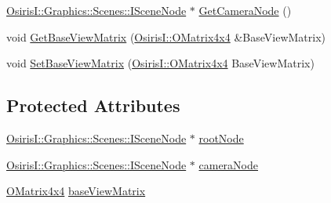 \begin{DoxyCompactItemize}
\item 
\hyperlink{class_osiris_i_1_1_graphics_1_1_scenes_1_1_i_scene_node}{Osiris\-I\-::\-Graphics\-::\-Scenes\-::\-I\-Scene\-Node} $\ast$ \hyperlink{class_osiris_i_1_1_graphics_1_1_renderer_1_1_i_renderer_aa52a5485fb2b04fc420fd615477ac683}{Get\-Camera\-Node} ()
\item 
void \hyperlink{class_osiris_i_1_1_graphics_1_1_renderer_1_1_i_renderer_adc629290666c90dc546a139cef4e8f3b}{Get\-Base\-View\-Matrix} (\hyperlink{struct_osiris_i_1_1_o_matrix4x4}{Osiris\-I\-::\-O\-Matrix4x4} \&Base\-View\-Matrix)
\item 
void \hyperlink{class_osiris_i_1_1_graphics_1_1_renderer_1_1_i_renderer_a3cc53b896fdc724d4f9519f5814fa179}{Set\-Base\-View\-Matrix} (\hyperlink{struct_osiris_i_1_1_o_matrix4x4}{Osiris\-I\-::\-O\-Matrix4x4} Base\-View\-Matrix)
\end{DoxyCompactItemize}
\subsection*{Protected Attributes}
\begin{DoxyCompactItemize}
\item 
\hyperlink{class_osiris_i_1_1_graphics_1_1_scenes_1_1_i_scene_node}{Osiris\-I\-::\-Graphics\-::\-Scenes\-::\-I\-Scene\-Node} $\ast$ \hyperlink{class_osiris_i_1_1_graphics_1_1_renderer_1_1_i_renderer_a402abcc0f06b70e7eea0706ac905c846}{root\-Node}
\item 
\hyperlink{class_osiris_i_1_1_graphics_1_1_scenes_1_1_i_scene_node}{Osiris\-I\-::\-Graphics\-::\-Scenes\-::\-I\-Scene\-Node} $\ast$ \hyperlink{class_osiris_i_1_1_graphics_1_1_renderer_1_1_i_renderer_af2af2a7bd5fb61a0067fc4f3e69b9761}{camera\-Node}
\item 
\hyperlink{struct_osiris_i_1_1_o_matrix4x4}{O\-Matrix4x4} \hyperlink{class_osiris_i_1_1_graphics_1_1_renderer_1_1_i_renderer_a7abb76a8ff2d8d056609e430babdcef4}{base\-View\-Matrix}
\end{DoxyCompactItemize}


